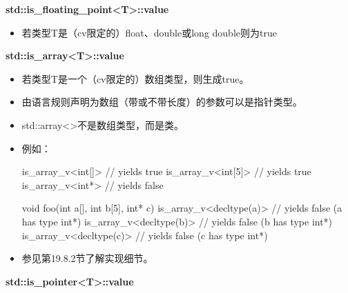 \textbf{std::is\_floating\_point<T>::value}

\begin{itemize}
\item 
若类型T是（cv限定的）float、double或long double则为true
\end{itemize}

\textbf{std::is\_array<T>::value}

\begin{itemize}
\item 
若类型T是一个（cv限定的）数组类型，则生成true。

\item 
由语言规则声明为数组（带或不带长度）的参数可以是指针类型。

\item 
std::array<>不是数组类型，而是类。

\item 
例如：

\begin{cpp}
is_array_v<int[]> // yields true
is_array_v<int[5]> // yields true
is_array_v<int*> // yields false

void foo(int a[], int b[5], int* c) {
	is_array_v<decltype(a)> // yields false (a has type int*)
	is_array_v<decltype(b)> // yields false (b has type int*)
	is_array_v<decltype(c)> // yields false (c has type int*)
}
\end{cpp}

\item 
参见第19.8.2节了解实现细节。
\end{itemize}

\textbf{std::is\_pointer<T>::value}

